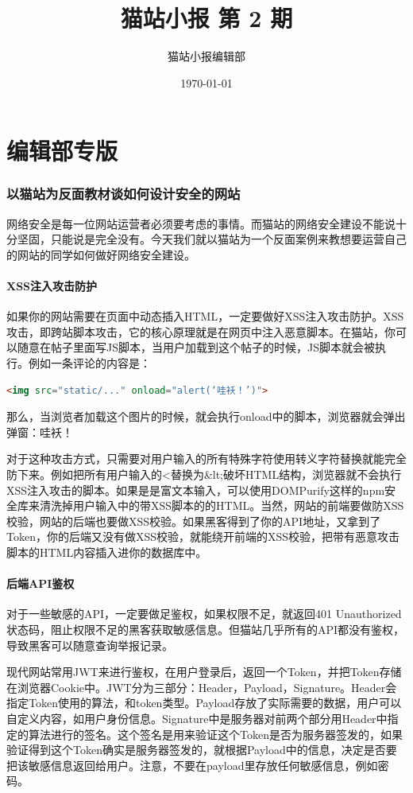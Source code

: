 \documentclass[UTF8]{ctexart}
\title{猫站小报 第 2 期}
\author{猫站小报编辑部}
\date{\today}
\begin{document}
\maketitle
\part{编辑部专版}
\section{以猫站为反面教材谈如何设计安全的网站}
网络安全是每一位网站运营者必须要考虑的事情。而猫站的网络安全建设不能说十分坚固，只能说是完全没有。今天我们就以猫站为一个反面案例来教想要运营自己的网站的同学如何做好网络安全建设。
\subsection{XSS注入攻击防护}
如果你的网站需要在页面中动态插入HTML，一定要做好XSS注入攻击防护。XSS攻击，即跨站脚本攻击，它的核心原理就是在网页中注入恶意脚本。在猫站，你可以随意在帖子里面写JS脚本，当用户加载到这个帖子的时候，JS脚本就会被执行。例如一条评论的内容是：
\begin{lstlisting}[language=HTML]
<img src="static/..." onload="alert(‘哇袄！’)">
\end{lstlisting}
那么，当浏览者加载这个图片的时候，就会执行onload中的脚本，浏览器就会弹出弹窗：哇袄！

对于这种攻击方式，只需要对用户输入的所有特殊字符使用转义字符替换就能完全防下来。例如把所有用户输入的<替换为\&lt;破坏HTML结构，浏览器就不会执行XSS注入攻击的脚本。如果是是富文本输入，可以使用DOMPurify这样的npm安全库来清洗掉用户输入中的带XSS脚本的的HTML。当然，网站的前端要做防XSS校验，网站的后端也要做XSS校验。如果黑客得到了你的API地址，又拿到了Token，你的后端又没有做XSS校验，就能绕开前端的XSS校验，把带有恶意攻击脚本的HTML内容插入进你的数据库中。

\subsection{后端API鉴权}
对于一些敏感的API，一定要做足鉴权，如果权限不足，就返回401 Unauthorized状态码，阻止权限不足的黑客获取敏感信息。但猫站几乎所有的API都没有鉴权，导致黑客可以随意查询举报记录。

现代网站常用JWT来进行鉴权，在用户登录后，返回一个Token，并把Token存储在浏览器Cookie中。JWT分为三部分：Header，Payload，Signature。Header会指定Token使用的算法，和token类型。Payload存放了实际需要的数据，用户可以自定义内容，如用户身份信息。Signature中是服务器对前两个部分用Header中指定的算法进行的签名。这个签名是用来验证这个Token是否为服务器签发的，如果验证得到这个Token确实是服务器签发的，就根据Payload中的信息，决定是否要把该敏感信息返回给用户。注意，不要在payload里存放任何敏感信息，例如密码。
\end{document}
